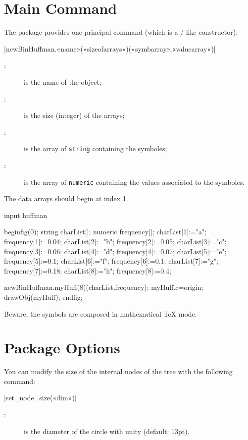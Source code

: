 \documentclass[english]{ltxdoc}
\begin{document}
\section{Main Command}

The package \huffman provides one principal command (which is a \MO/ like
constructor):

\commande|newBinHuffman.«name»(«sizeofarrays»)(«symbarray»,«valuearray»)|\smallskip{}


\begin{description}
  \item[:] is the name of the object;
  \item[:] is the size (integer) of the arrays;
  \item[:] is the array of \lstinline+string+ containing the
  symboles;
  \item[:] is the array of \lstinline+numeric+ containing the
  values associated to the symboles.
\end{description}

The data arrays should begin at index 1.  

\begin{ExempleMP}
input huffman

beginfig(0);
string charList[];
numeric frequency[];
charList[1]:="a"; frequency[1]:=0.04;
charList[2]:="b"; frequency[2]:=0.05;
charList[3]:="c"; frequency[3]:=0.06;
charList[4]:="d"; frequency[4]:=0.07;
charList[5]:="e"; frequency[5]:=0.1;
charList[6]:="f"; frequency[6]:=0.1;
charList[7]:="g"; frequency[7]:=0.18;
charList[8]:="h"; frequency[8]:=0.4;

newBinHuffman.myHuff(8)(charList,frequency);
myHuff.c=origin;
drawObj(myHuff);
endfig;
\end{ExempleMP}

Beware, the symbols are composed in mathematical \TeX{} mode. 
\section{Package Options}

You can modify the size of the internal nodes of the tree with the following
command:

\commande|set_node_size(«dim»)|\smallskip{}
\begin{description}
  \item[:] is the diameter of the circle with unity (default: 13pt).
\end{description} 
\end{document}
